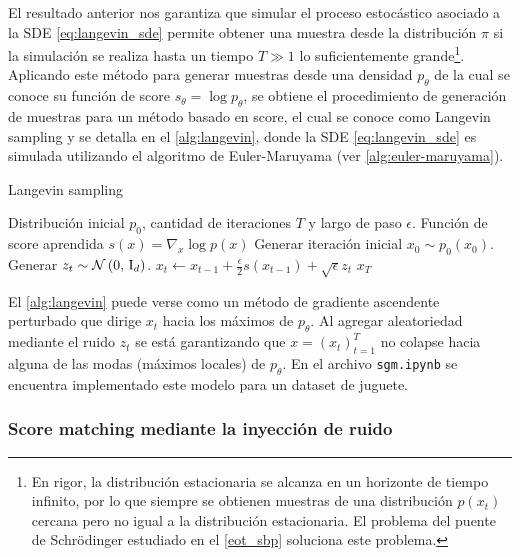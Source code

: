 El resultado anterior nos garantiza que simular el proceso estocástico asociado a la SDE \eqref{eq:langevin_sde} permite obtener una muestra desde la distribución $\pi$ si la simulación se realiza hasta un tiempo $T\gg 1$ lo suficientemente grande\footnote{En rigor, la distribución estacionaria se alcanza en un horizonte de tiempo infinito, por lo que siempre se obtienen muestras de una distribución $p(x_t)$ cercana pero no igual a la distribución estacionaria. El problema del puente de Schrödinger estudiado en el \autoref{eot_sbp} soluciona este problema.}. Aplicando este método para generar muestras desde una densidad $p_\theta$ de la cual se conoce su función de score $s_\theta=\log p_\theta$, se obtiene el procedimiento de generación de muestras para un método basado en score, el cual se conoce como Langevin sampling y se detalla en el \autoref{alg:langevin}, donde la SDE \eqref{eq:langevin_sde} es simulada utilizando el algoritmo de Euler-Maruyama (ver \autoref{alg:euler-maruyama}).

\begin{algorithm}
    \caption{Langevin sampling}
    \label{alg:langevin}
    \begin{algorithmic}[1]
        \Require Distribución inicial $p_0$, cantidad de iteraciones $T$ y largo de paso $\epsilon$.
        \Require Función de score aprendida $s(x) = \nabla_x \log p(x)$
        \State Generar iteración inicial $x_0\sim p_0(x_0)$.
        \State Generar $z_t\sim \mathcal{N}\left(0,\,\operatorname{I}_{d}\right)$.
        \State $x_t\gets x_{t-1} + \frac{\epsilon}{2}s(x_{t-1}) + \sqrt{\epsilon} z_t$
        \EndFor
        \State\Return $x_T$
    \end{algorithmic}
\end{algorithm}

El \autoref{alg:langevin} puede verse como un método de gradiente ascendente perturbado que dirige $x_t$ hacia los máximos de $p_\theta$. Al agregar aleatoriedad mediante el ruido $z_t$ se está garantizando que $x=(x_t)_{t=1}^T$ no colapse hacia alguna de las modas (máximos locales) de $p_\theta$. En el archivo \texttt{sgm.ipynb} se encuentra implementado este modelo para un dataset de juguete.

\subsubsection{Score matching mediante la inyección de ruido}

